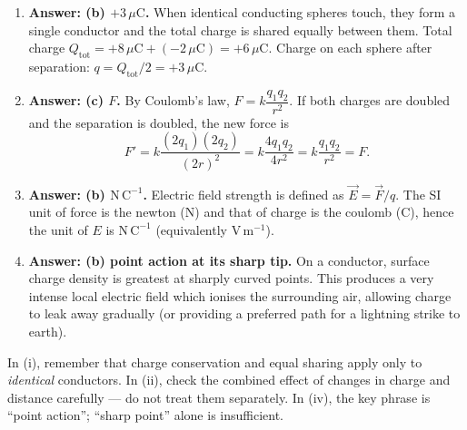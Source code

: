 \documentclass[11pt]{article}
\begin{document}
\begin{corrige}
\begin{enumerate}
\item \textbf{Answer: (b) $+3\,\mu\mathrm{C}$.} When identical conducting spheres touch, they form a single conductor and the total charge is shared equally between them. Total charge $Q_{\text{tot}} = +8\,\mu\mathrm{C} + (-2\,\mu\mathrm{C}) = +6\,\mu\mathrm{C}$. Charge on each sphere after separation: $q = Q_{\text{tot}}/2 = +3\,\mu\mathrm{C}$.
\item \textbf{Answer: (c) $F$.} By Coulomb's law, $F = k\dfrac{q_{1}q_{2}}{r^{2}}$. If both charges are doubled and the separation is doubled, the new force is
\[
F' = k\dfrac{(2q_{1})(2q_{2})}{(2r)^{2}} = k\dfrac{4q_{1}q_{2}}{4r^{2}} = k\dfrac{q_{1}q_{2}}{r^{2}} = F.
\]
\item \textbf{Answer: (b) $\mathrm{N\,C^{-1}}$.} Electric field strength is defined as $\vec{E} = \vec{F}/q$. The SI unit of force is the newton ($\mathrm{N}$) and that of charge is the coulomb ($\mathrm{C}$), hence the unit of $E$ is $\mathrm{N\,C^{-1}}$ (equivalently $\mathrm{V\,m^{-1}}$).
\item \textbf{Answer: (b) point action at its sharp tip.} On a conductor, surface charge density is greatest at sharply curved points. This produces a very intense local electric field which ionises the surrounding air, allowing charge to leak away gradually (or providing a preferred path for a lightning strike to earth).
\end{enumerate}
\end{corrige}

\begin{attention}
In (i), remember that charge conservation and equal sharing apply only to \emph{identical} conductors. In (ii), check the combined effect of changes in charge and distance carefully — do not treat them separately. In (iv), the key phrase is ``point action''; ``sharp point'' alone is insufficient.
\end{attention}
\end{document}
